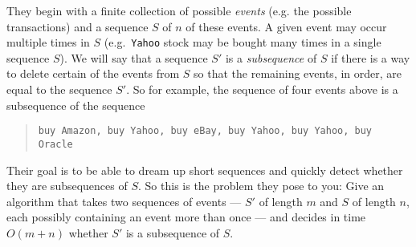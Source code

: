 \documentclass[12pt]{article}
\begin{document}
\begin{enumerate}
They begin with a finite collection of possible
{\em events} (e.g. the possible transactions)
and a sequence $S$ of $n$ of these events.
A given event may occur multiple times in $S$
(e.g.~{\tt Yahoo} stock may be bought many times in a single sequence $S$).
We will say that a sequence $S'$ is a {\em subsequence}
of $S$ if there is a way to delete certain of the events
from $S$ so that the remaining events, in order, are equal to
the sequence $S'$.
So for example, the sequence of four events above is
a subsequence of the sequence
\begin{quote}
{\tt buy Amazon, buy Yahoo, buy eBay,
buy Yahoo, buy Yahoo, buy Oracle}
\end{quote}

Their goal is to be able to dream up short sequences
and quickly detect whether they are subsequences of $S$.
So this is the problem they pose to you:
Give an algorithm that takes
two sequences of events ---  $S'$ of length $m$ and $S$ of
length $n$, each possibly containing an event more than once ---
and decides in time $O(m + n)$ whether $S'$ is a subsequence of $S$.

\end{enumerate}
\end{document}
